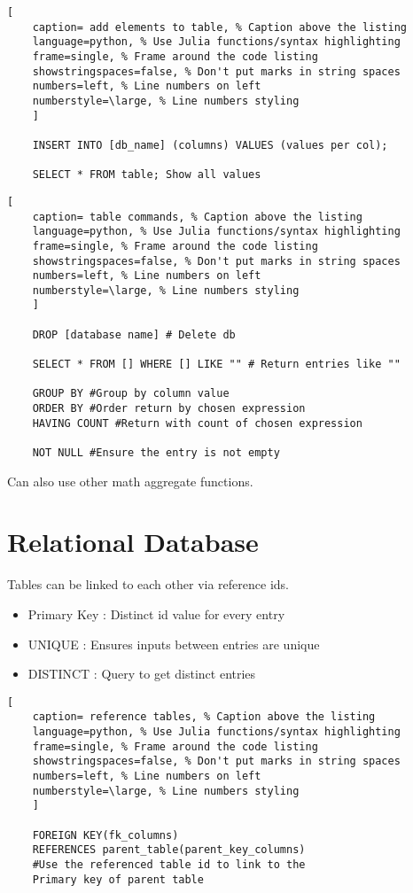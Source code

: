 \documentclass[11pt]{scrartcl} %
\begin{document}
\begin{lstlisting}[
	caption= add elements to table, % Caption above the listing
	language=python, % Use Julia functions/syntax highlighting
	frame=single, % Frame around the code listing
	showstringspaces=false, % Don't put marks in string spaces
	numbers=left, % Line numbers on left
	numberstyle=\large, % Line numbers styling
	]

	INSERT INTO [db_name] (columns) VALUES (values per col);

	SELECT * FROM table; Show all values	

\end{lstlisting}

\begin{lstlisting}[
	caption= table commands, % Caption above the listing
	language=python, % Use Julia functions/syntax highlighting
	frame=single, % Frame around the code listing
	showstringspaces=false, % Don't put marks in string spaces
	numbers=left, % Line numbers on left
	numberstyle=\large, % Line numbers styling
	]

	DROP [database name] # Delete db

	SELECT * FROM [] WHERE [] LIKE "" # Return entries like ""
	
	GROUP BY #Group by column value
	ORDER BY #Order return by chosen expression
	HAVING COUNT #Return with count of chosen expression

	NOT NULL #Ensure the entry is not empty
\end{lstlisting}

Can also use other math aggregate functions.

\section{Relational Database}

Tables can be linked to each other via reference ids.

\begin{itemize}
	\item Primary Key : Distinct id value for every entry
	\item UNIQUE : Ensures inputs between entries are unique
	\item DISTINCT : Query to get distinct entries
\end{itemize}

\begin{lstlisting}[
	caption= reference tables, % Caption above the listing
	language=python, % Use Julia functions/syntax highlighting
	frame=single, % Frame around the code listing
	showstringspaces=false, % Don't put marks in string spaces
	numbers=left, % Line numbers on left
	numberstyle=\large, % Line numbers styling
	]

	FOREIGN KEY(fk_columns) 
	REFERENCES parent_table(parent_key_columns)
	#Use the referenced table id to link to the 
	Primary key of parent table

\end{lstlisting}
\end{document}
